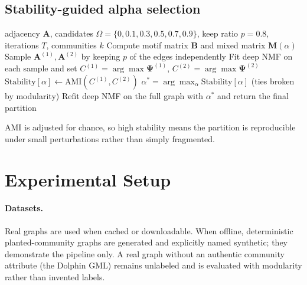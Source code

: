 \documentclass[11pt,a4paper]{article}
\begin{document}
\subsection{Stability-guided alpha selection}
\begin{algorithm}[H]
\caption{Stability-guided selection of $\alpha$ (SG-DMNMF)}
\begin{algorithmic}[1]
\REQUIRE adjacency $\mathbf{A}$, candidates $\Omega=\{0,0.1,0.3,0.5,0.7,0.9\}$, keep ratio $p=0.8$, iterations $T$, communities $k$
\STATE Compute motif matrix $\mathbf{B}$ and mixed matrix $\mathbf{M}(\alpha)$
  \STATE Sample $\mathbf{A}^{(1)},\mathbf{A}^{(2)}$ by keeping $p$ of the edges independently
  \STATE Fit deep NMF on each sample and set $C^{(1)}=\arg\max\mathbf{\Psi}^{(1)}$, $C^{(2)}=\arg\max\mathbf{\Psi}^{(2)}$
  \STATE $\mathrm{Stability}[\alpha]\leftarrow \mathrm{AMI}(C^{(1)},C^{(2)})$
\ENDFOR
\STATE $\alpha^{*}=\arg\max_{\alpha}\mathrm{Stability}[\alpha]$ (ties broken by modularity)
\STATE Refit deep NMF on the full graph with $\alpha^{*}$ and return the final partition
\end{algorithmic}
\end{algorithm}
AMI is adjusted for chance, so high stability means the partition is reproducible under
small perturbations rather than simply fragmented.

\section{Experimental Setup}
\paragraph{Datasets.} Real graphs are used when cached or downloadable. When offline,
deterministic planted-community graphs are generated and explicitly named synthetic; they
demonstrate the pipeline only. A real graph without an authentic community attribute (the
Dolphin GML) remains unlabeled and is evaluated with modularity rather than invented labels.
\begin{table}[H]
\centering
\small
{}
\caption{Datasets used in the quick run. Synthetic stand-ins are explicitly marked and are not used for scientific claims.}
\label{tab:datasets}
\end{table}
\end{document}
